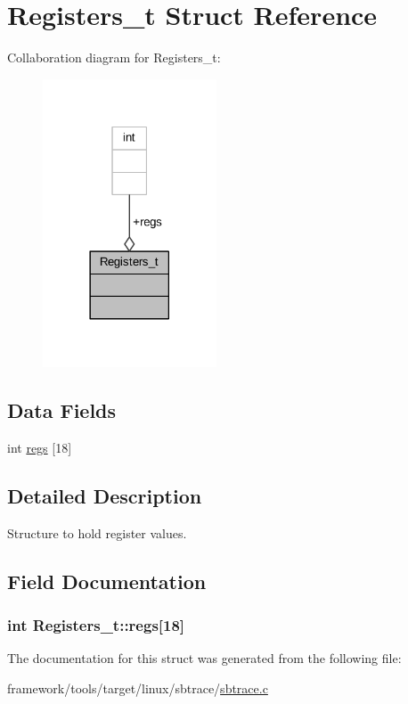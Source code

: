 \hypertarget{struct_registers__t}{}\section{Registers\+\_\+t Struct Reference}
\label{struct_registers__t}


Collaboration diagram for Registers\+\_\+t\+:
\nopagebreak
\begin{figure}[H]
\begin{center}
\leavevmode
\includegraphics[width=146pt]{struct_registers__t__coll__graph}
\end{center}
\end{figure}
\subsection*{Data Fields}
\begin{DoxyCompactItemize}
\item 
int \hyperlink{struct_registers__t_ac499bafd63ac3b63cd34d3e181068696}{regs} \mbox{[}18\mbox{]}
\end{DoxyCompactItemize}


\subsection{Detailed Description}
Structure to hold register values. 

\subsection{Field Documentation}
\subsubsection[{\texorpdfstring{regs}{regs}}]{\setlength{\rightskip}{0pt plus 5cm}int Registers\+\_\+t\+::regs\mbox{[}18\mbox{]}}\hypertarget{struct_registers__t_ac499bafd63ac3b63cd34d3e181068696}{}\label{struct_registers__t_ac499bafd63ac3b63cd34d3e181068696}


The documentation for this struct was generated from the following file\+:\begin{DoxyCompactItemize}
\item 
framework/tools/target/linux/sbtrace/\hyperlink{sbtrace_8c}{sbtrace.\+c}\end{DoxyCompactItemize}
